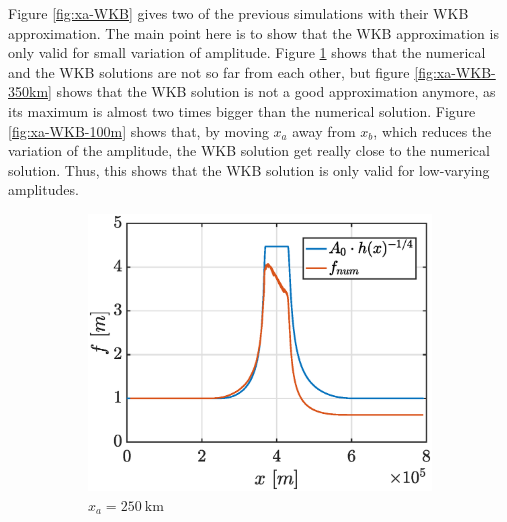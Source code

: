 \documentclass[a4paper,12pt,twoside]{article}
\begin{document}
        Figure \ref{fig:xa-WKB} gives two of the previous simulations with their WKB approximation.
        The main point here is to show that the WKB approximation is only valid for small variation of amplitude.
        Figure \ref{fig:xa-WKB-250km} shows that the numerical and the WKB solutions are not so far from each other, but figure \ref{fig:xa-WKB-350km} shows that the WKB solution is not a good approximation anymore, as its maximum is almost two times bigger than the numerical solution.
        Figure \ref{fig:xa-WKB-100m} shows that, by moving $x_a$ away from $x_b$, which reduces the variation of the amplitude, the WKB solution get really close to the numerical solution.
        Thus, this shows that the WKB solution is only valid for low-varying amplitudes.

        \begin{figure}[h]
          \centering
            \begin{subfigure}[t]{0.45\textwidth}
              \includegraphics[width=\textwidth]{graphs/xa250000_tfin15000_f.eps}
              \caption{$x_a = \SI{250}{\kilo\meter}$}
              \label{fig:xa-WKB-250km}
            \end{subfigure}
            ~
            \begin{subfigure}[t]{0.45\textwidth}

\end{subfigure}
\end{figure}
\end{document}
